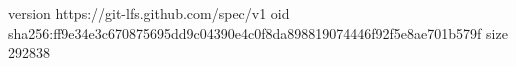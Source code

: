 version https://git-lfs.github.com/spec/v1
oid sha256:ff9e34e3c670875695dd9c04390e4c0f8da898819074446f92f5e8ae701b579f
size 292838
